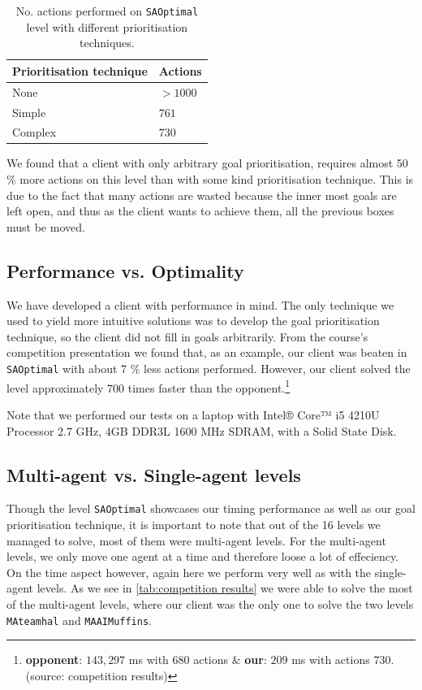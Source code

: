\begin{table}[h!]
  \centering
  \begin{tabular}{@{}ll@{}}
    \toprule
    Prioritisation technique & Actions \\
    \midrule
    None    & $>1000$ \\
    Simple  & $761$ \\
    Complex & $730$ \\
    \bottomrule
  \end{tabular}
  \caption{\label{tab:SAOptimal_results}No. actions performed on \texttt{SAOptimal} level with different prioritisation techniques.}
\end{table}

We found that a client with only arbitrary goal prioritisation, requires almost 50 \% more actions on this level than with some kind prioritisation technique.
This is due to the fact that many actions are wasted because the inner most goals are left open, and thus as the client wants to achieve them, all the previous boxes must be moved.

\subsection{Performance vs. Optimality}
\label{sec:performance vs. optimality}

We have developed a client with performance in mind.
The only technique we used to yield more intuitive solutions was to develop the goal prioritisation technique, so the client did not fill in goals arbitrarily.
From the course's competition presentation we found that, as an example, our client was beaten in \texttt{SAOptimal} with about 7 \% less actions performed.
However, our client solved the level approximately 700 times faster than the opponent.\footnote{\textbf{opponent}: $143,297$ ms with $680$ actions \& \textbf{our}: $209$ ms with actions $730$. (source: competition results)}

Note that we performed our tests on a laptop with Intel® Core™ i5 4210U Processor 2.7 GHz, 4GB DDR3L 1600 MHz SDRAM, with a Solid State Disk.

\subsection{Multi-agent vs. Single-agent levels}
Though the level \texttt{SAOptimal} showcases our timing performance as well as our goal prioritisation technique, it is important to note that out of the 16 levels we managed to solve, most of them were multi-agent levels. For the multi-agent levels, we only move one agent at a time and therefore loose a lot of effeciency. 
On the time aspect however, again here we perform very well as with the single-agent levels. 
As we see in \cref{tab:competition results} we were able to solve the most of the multi-agent levels, where our client was the only one to solve the two levels \texttt{MAteamhal} and \texttt{MAAIMuffins}.


